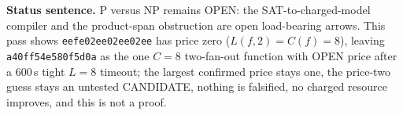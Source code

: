 \documentclass[11pt]{article}
\begin{document}
\bigskip
\noindent\textbf{Status sentence.} P versus NP remains OPEN: the SAT-to-charged-model compiler and the product-span obstruction are open load-bearing arrows. This pass shows \texttt{eefe02ee02ee02ee} has price zero ($L(f,2)=C(f)=8$), leaving \texttt{a40ff54e580f5d0a} as the one $C=8$ two-fan-out function with OPEN price after a 600\,s tight $L=8$ timeout; the largest confirmed price stays one, the price-two guess stays an untested CANDIDATE, nothing is falsified, no charged resource improves, and this is not a proof.
\end{document}
